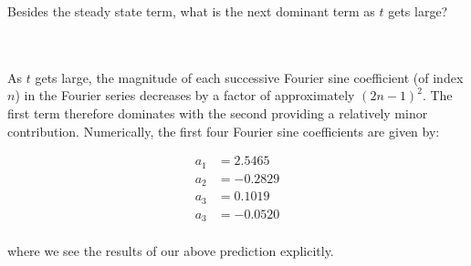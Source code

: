 Besides the steady state term, what is the next dominant term as $t$ gets large?

\begin{solution}\ \\\\
    As $t$ gets large, the magnitude of each successive Fourier sine coefficient (of index $n$) in the Fourier series 
    decreases by a factor of approximately $(2n - 1)^2$. The first term therefore dominates with the second providing a
    relatively minor contribution. Numerically, the first four Fourier sine coefficients are given by:

    \begin{align*}
        a_1 &= 2.5465  \\
        a_2 &= -0.2829 \\
        a_3 &= 0.1019  \\
        a_3 &= -0.0520 \\
    \end{align*}

    where we see the results of our above prediction explicitly.

    \ \\
\end{solution}